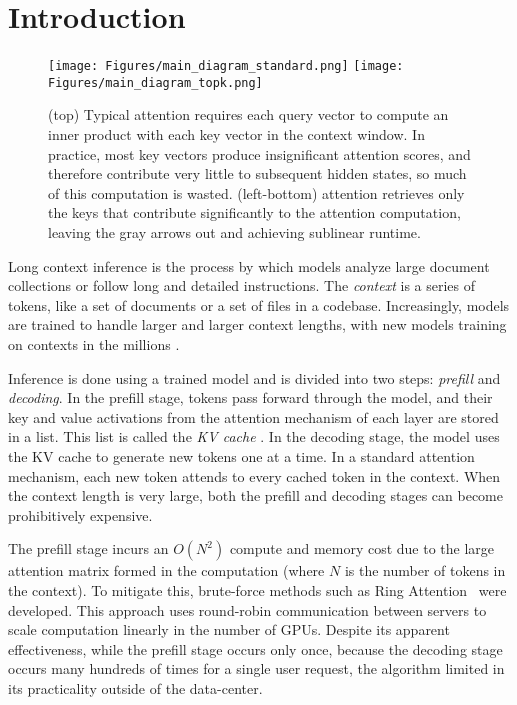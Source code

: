 \section{Introduction}
\label{introduction}
\begin{figure}[!ht]
    \centering
    \texttt{[image: Figures/main\_diagram\_standard.png]}
    \texttt{[image: Figures/main\_diagram\_topk.png]}
    \caption{(top) Typical attention requires each query vector to compute an inner product with each key vector in the context window.  In practice, most key vectors produce insignificant attention scores, and therefore contribute very little to subsequent hidden states, so much of this computation is wasted. (left-bottom)  \topk attention retrieves only the keys that contribute significantly to the attention computation, leaving the gray arrows out and achieving sublinear runtime. }
    \label{fig:diagram}
\end{figure}

Long context inference is the process by which models analyze large document collections or follow long and detailed instructions. 
The \emph{context} is a series of tokens, like a set of documents or a set of files in a codebase. 
Increasingly, models are trained to handle larger and larger context lengths, with new models training on contexts in the millions \citep{liu2024worldmodelmillionlengthvideo}.

Inference is done using a trained model and is divided into two steps: \emph{prefill} and \emph{decoding}. In the prefill stage, tokens pass forward through the model, and their key and value activations from the attention mechanism of each layer are stored in a list. 
This list is called the \emph{KV cache} \citep{pope2023efficiently}. 
In the decoding stage, the model uses the KV cache to generate new tokens one at a time. 
In a standard attention mechanism, each new token attends to every cached token in the context. 
When the context length is very large, both the prefill and decoding stages can become prohibitively expensive.

The prefill stage incurs an $O(N^2)$ compute and memory cost due to the large attention matrix formed in the computation (where $N$ is the number of tokens in the context). To mitigate this, brute-force methods such as Ring Attention~\citep{liu2023ringattentionblockwisetransformers} were developed. This approach uses round-robin communication between servers to scale computation linearly in the number of GPUs. Despite its apparent effectiveness, while the prefill stage occurs only once, because the decoding stage occurs many hundreds of times for a single user request, the algorithm limited in its practicality outside of the data-center.

